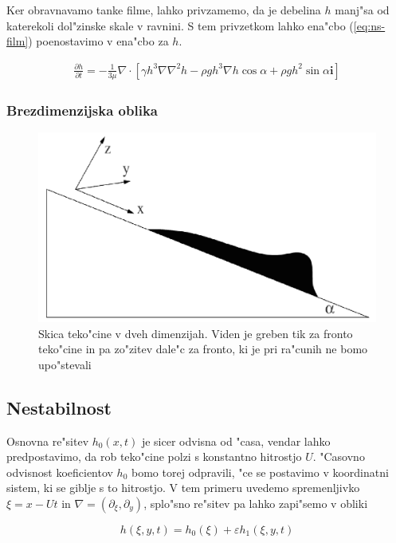 \documentclass[a4paper,10pt]{article}
\renewcommand{\vec}{\mathbf}
\newcommand{\eps}{\varepsilon}
\begin{document}
Ker obravnavamo tanke filme, lahko privzamemo, da je debelina $h$ manj"sa od katerekoli dol"zinske skale v ravnini. S tem privzetkom lahko ena"cbo (\ref{eq:ns-film}) poenostavimo v ena"cbo za $h$. 

\begin{align}
 \frac{\partial h}{\partial t} = -\frac{1}{3\mu}\nabla \cdot \left[ \gamma h^3 \nabla \nabla^2 h - \rho g h^3 \nabla h \cos \alpha + \rho g h^2 \sin \alpha \vec i \right]
\end{align}

\subsubsection{Brezdimenzijska oblika}

\begin{figure}[h]
\centering
 \includegraphics[width=.8\textwidth]{./Slike/film-skica}
\caption{Skica teko"cine v dveh dimenzijah. Viden je greben tik za fronto teko"cine in pa zo"zitev dale"c za fronto, ki je pri ra"cunih ne bomo upo"stevali}
\label{fig:film-skica}
\end{figure}

\subsection{Nestabilnost}

Osnovna re"sitev $h_0(x, t)$ je sicer odvisna od "casa, vendar lahko predpostavimo, da rob teko"cine polzi s konstantno hitrostjo $U$. "Casovno odvisnost koeficientov $h_0$ bomo torej odpravili, "ce se postavimo v koordinatni sistem, ki se giblje s to hitrostjo. V tem primeru uvedemo spremenljivko $\xi = x - Ut$ in $\nabla = (\partial_\xi, \partial_y)$, splo"sno re"sitev pa lahko zapi"semo v obliki

\begin{equation}
 h(\xi, y, t) = h_0(\xi) + \eps h_1(\xi, y, t)
\end{equation}
\end{document}
